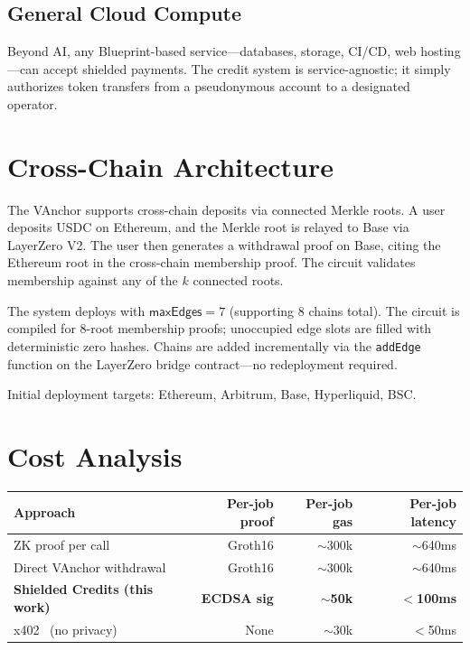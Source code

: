\documentclass[11pt,a4paper]{article}
\theoremstyle{definition}
\begin{document}
\subsection{General Cloud Compute}

Beyond AI, any Blueprint-based service---databases, storage, CI/CD, web hosting---can accept shielded payments. The credit system is service-agnostic; it simply authorizes token transfers from a pseudonymous account to a designated operator.

\section{Cross-Chain Architecture}

The VAnchor supports cross-chain deposits via connected Merkle roots. A user deposits USDC on Ethereum, and the Merkle root is relayed to Base via LayerZero V2. The user then generates a withdrawal proof on Base, citing the Ethereum root in the cross-chain membership proof. The circuit validates membership against any of the $k$ connected roots.

The system deploys with $\mathsf{maxEdges} = 7$ (supporting 8 chains total). The circuit is compiled for 8-root membership proofs; unoccupied edge slots are filled with deterministic zero hashes. Chains are added incrementally via the \texttt{addEdge} function on the LayerZero bridge contract---no redeployment required.

Initial deployment targets: Ethereum, Arbitrum, Base, Hyperliquid, BSC.

\section{Cost Analysis}

\begin{center}
\begin{tabular}{lrrr}
\hline
\textbf{Approach} & \textbf{Per-job proof} & \textbf{Per-job gas} & \textbf{Per-job latency} \\
\hline
ZK proof per call~\cite{zkapi} & Groth16 & $\sim$300k & $\sim$640ms \\
Direct VAnchor withdrawal & Groth16 & $\sim$300k & $\sim$640ms \\
\textbf{Shielded Credits (this work)} & \textbf{ECDSA sig} & $\sim$\textbf{50k} & $<$\textbf{100ms} \\
x402~\cite{x402} (no privacy) & None & $\sim$30k & $<$50ms \\
\hline
\end{tabular}
\end{center}
\end{document}
